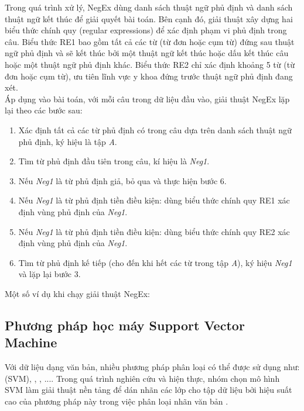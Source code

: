 Trong quá trình xử lý, NegEx dùng danh sách thuật ngữ phủ định và danh sách thuật ngữ kết thúc để giải quyết bài toán. Bên cạnh đó, giải thuật xây dựng hai biểu thức chính quy (regular expressions) để xác định phạm vi phủ định trong câu. Biểu thức RE1 bao gồm tất cả các từ (từ đơn hoặc cụm từ) đứng sau thuật ngữ phủ định và sẽ kết thúc bởi một thuật ngữ kết thúc hoặc dấu kết thúc câu hoặc một thuật ngữ phủ định khác. Biểu thức RE2 chỉ xác định khoảng 5 từ (từ đơn hoặc cụm từ), ưu tiên lĩnh vực y khoa đứng trước thuật ngữ phủ định đang xét. \\

Áp dụng vào bài toán, với mỗi câu trong dữ liệu đầu vào, giải thuật NegEx lặp lại theo các bước sau:

\begin{enumerate}
\item Xác định tất cả các từ phủ định có trong câu dựa trên danh sách thuật ngữ phủ định, ký hiệu là tập \textit{A}.
\item Tìm từ phủ định đầu tiên trong câu, kí hiệu là \textit{Neg1}.
\item Nếu \textit{Neg1} là từ phủ định giả, bỏ qua và thực hiện bước 6.
\item Nếu \textit{Neg1} là từ phủ định tiền điều kiện: dùng biểu thức chính quy RE1 xác định vùng phủ định của \textit{Neg1}.
\item Nếu \textit{Neg1} là từ phủ định tiền điều kiện: dùng biểu thức chính quy RE2 xác định vùng phủ định của \textit{Neg1}.
\item Tìm từ phủ định kế tiếp (cho đến khi hết các từ trong tập \textit{A}), ký hiệu \textit{Neg1} và lặp lại bước 3.
\end{enumerate}

Một số ví dụ khi chạy giải thuật NegEx:


\subsection{Phương pháp học máy Support Vector Machine}
Với dữ liệu dạng văn bản, nhiều phương pháp phân loại có thể được sử dụng như:  (SVM), , , ...\cite{manning2009anintroduction}. Trong quá trình nghiên cứu và hiện thực, nhóm chọn mô hình SVM làm giải thuật nền tảng để dán nhãn các lớp cho tập dữ liệu bởi hiệu suất cao của phương pháp này trong việc phân loại nhãn văn bản \cite{joachims1998text}.\\

